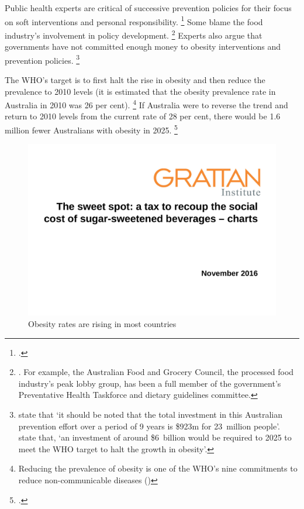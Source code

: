 \documentclass[embargoed]{grattan}
\begin{document}
Public health experts are critical of successive prevention policies for their focus on soft interventions and personal responsibility.%
\footcites{Capacci2012Policiespromotehealthy}{Swinburn2013Progressobesityprevention}{Australia2015NoTimeWeight} Some blame the food industry's involvement in policy development.%
\footnote{\textcites{Swinburn2013Progressobesityprevention}{Roberto2015Patchyprogressobesity}{Brownell2009perilsignoringhistory}.
For example, the Australian Food and Grocery Council, the processed food industry's peak lobby group, has been a full member of the government's Preventative Health Taskforce and dietary guidelines committee.} Experts also argue that governments have not committed enough money to obesity interventions and prevention policies.%
\footnote{\textcite{Swinburn2013Progressobesityprevention} state that `it should be noted that the total investment in this Australian prevention effort over a period of 9 years is \$923m for 23~million people'. \textcite{Australia2015NoTimeWeight} state that, `an investment of around \$6~billion would be required to 2025 to meet the WHO target to halt the growth in obesity'.}

The WHO's target is to first halt the rise in obesity and then reduce the prevalence to 2010 levels (it is estimated that the obesity prevalence rate in Australia in 2010 was 26 per cent).%
\footnote{Reducing the prevalence of obesity is one of the WHO's nine commitments to reduce non-communicable diseases (\textcites{Organization2013GlobalActionPlan}{Organization2016ObesityoverweightFact})} If Australia were to reverse the trend and return to 2010 levels from the current rate of 28 per cent, there would be 1.6 million fewer Australians with obesity in 2025.%
\footcite{Australia2015NoTimeWeight}


\begin{figure}
\caption{Obesity rates are rising in most countries }

\includegraphics[page=3]{atlas/ObesityCharts}


\end{figure}
\end{document}
